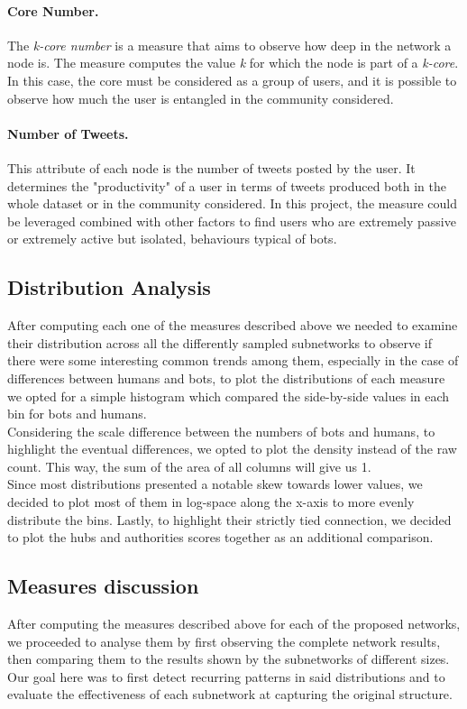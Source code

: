 \documentclass[12pt, a4paper]{article}
\begin{document}
		\paragraph{Core Number.} The \textit{k-core number} is a measure that aims to observe how deep in the network a node is. The measure computes the value \textit{k} for which the node is part of a \textit{k-core}. In this case, the core must be considered as a group of users, and it is possible to observe how much the user is entangled in the community considered.
        \paragraph{Number of Tweets.} This attribute of each node is the number of tweets posted by the user. It determines the "productivity" of a user in terms of tweets produced both in the whole dataset or in the community considered. In this project, the measure could be leveraged combined with other factors to find users who are extremely passive or extremely active but isolated, behaviours typical of bots.
	\subsection{Distribution Analysis}
    	After computing each one of the measures described above we needed to examine their distribution across all the differently sampled subnetworks to observe if there were some interesting common trends among them, especially in the case of differences between humans and bots, to plot the distributions of each measure we opted for a simple histogram which compared the side-by-side values in each bin for bots and humans.\\       
    	Considering the scale difference between the numbers of bots and humans, to highlight the eventual differences, we opted to plot the density instead of the raw count. This way, the sum of the area of all columns will give us 1.\\
    	Since most distributions presented a notable skew towards lower values, we decided to plot most of them in log-space along the x-axis to more evenly distribute the bins.
    	Lastly, to highlight their strictly tied connection, we decided to plot the hubs and authorities scores together as an additional comparison.
    \subsection{Measures discussion}
    	After computing the measures described above for each of the proposed networks, we proceeded to analyse them by first observing the complete network results, then comparing them to the results shown by the subnetworks of different sizes. Our goal here was to first detect recurring patterns in said distributions and to evaluate the effectiveness of each subnetwork at capturing the original structure.
\end{document}
